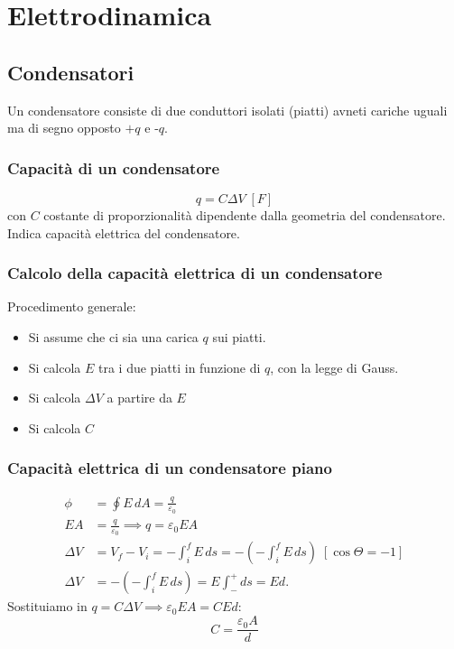 \chapter{Elettrodinamica}

    \section{Condensatori} Un condensatore consiste di due conduttori isolati
    (piatti) avneti cariche uguali ma di segno opposto $+q$ e -$q$.

        \subsection{Capacità di un condensatore}
            \begin{equation}
                q = C\Delta V\;[F]
            \end{equation}
        con $C$ costante di proporzionalità dipendente dalla geometria del 
        condensatore. Indica capacità elettrica del condensatore.
        
        \subsection{Calcolo della capacità elettrica di un condensatore} 
        Procedimento generale:
            \begin{itemize}
                \item Si assume che ci sia una carica $q$ sui piatti.
                \item Si calcola $E$ tra i due piatti in funzione di $q$, con 
                la legge di Gauss.
                \item Si calcola $\Delta V$ a partire da $E$
                \item Si calcola $C$
            \end{itemize}
        
        \subsection{Capacità elettrica di un condensatore piano}
            \begin{align*}
                \phi &= \oint E \, dA = \frac{q}{\varepsilon_0} \\
                EA &= \frac{q}{\varepsilon_0} \implies q = \varepsilon_0 E A \\
                \Delta V &= V_f - V_i = -\int_{i}^{f} E \, ds 
                        = -(-\int_{i}^{f} E \, ds) \; [\cos\Theta = -1]\\
                \Delta V &= -(-\int_{i}^{f} E \, ds) = E \int_{-}^{+} ds = Ed.
            \end{align*}
        Sostituiamo in $q = C\Delta V \implies \varepsilon_0EA = CEd$:
            \begin{equation}
                C = \frac{\varepsilon_0A}{d}
            \end{equation}

